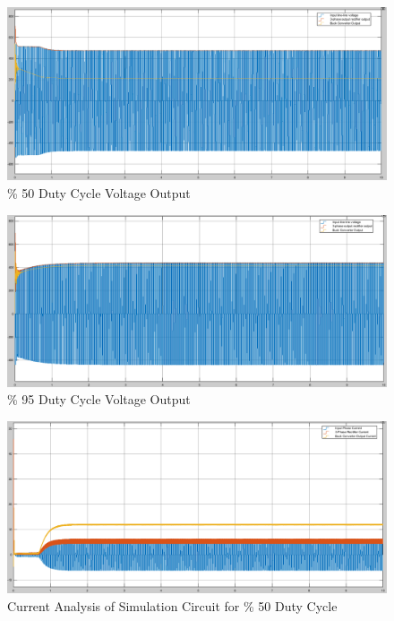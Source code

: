 \documentclass{article}
\begin{document}
\begin{figure}[H]
\centering
\includegraphics[scale=0.25]{voltagesnoktabesduty}
\caption{\% 50 Duty Cycle Voltage Output}
\label{fig:members}
\end{figure}

\begin{figure}[H]
\centering
\includegraphics[scale=0.25]{voltagesnoktadokuzduty}
\caption{\% 95 Duty Cycle Voltage Output}
\label{fig:members}
\end{figure}

\begin{figure}[H]
\centering
\includegraphics[scale=0.25]{diodebuckcurrents}
\caption{Current Analysis of Simulation Circuit for \% 50 Duty Cycle }
\label{fig:members}
\end{figure}
\end{document}
